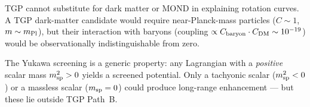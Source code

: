 TGP cannot substitute for dark matter or MOND in explaining rotation curves.
A TGP dark-matter candidate would require near-Planck-mass particles
($C\sim1$, $m\sim m_{\rm Pl}$), but their interaction with baryons
(coupling $\propto C_{\rm baryon}\cdot C_{\rm DM}\sim10^{-19}$) would
be observationally indistinguishable from zero.

The Yukawa screening is a generic property: any Lagrangian with a
\emph{positive} scalar mass $m_{\rm sp}^2>0$ yields a screened potential.
Only a tachyonic scalar ($m_{\rm sp}^2<0$) or a massless scalar ($m_{\rm sp}=0$)
could produce long-range enhancement — but these lie outside TGP Path~B.
